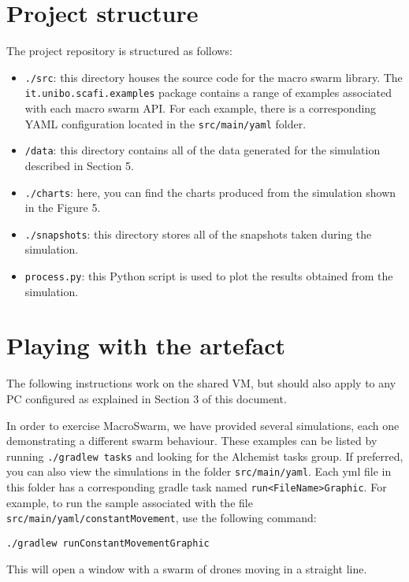\documentclass[runningheads]{llncs}
\newcommand{\MacroSwarm}{{\sc{}MacroSwarm}}
\begin{document}
\section{Project structure}

The project repository is structured as follows:
\begin{itemize}
  \item \texttt{./src}: 
  this directory houses the source code for the macro swarm library. 
  The \texttt{it.unibo.scafi.examples} package contains a range of examples associated with each macro swarm API. 
  For each example, there is a corresponding YAML configuration located in the \texttt{src/main/yaml} folder.

  \item \texttt{/data}: this directory contains all of the data generated for the simulation described in Section 5.
  
  \item \texttt{./charts}: here, you can find the charts produced from the simulation shown in the Figure 5.
  
  \item \texttt{./snapshots}: 
  this directory stores all of the snapshots taken during the simulation.
  
  \item \texttt{process.py}: 
  this Python script is used to plot the results obtained from the simulation.
  
\end{itemize}

\section{Playing with the artefact}

The following instructions work on the shared VM, 
 but should also apply to any PC configured as explained in Section 3 of this document.
 
In order to exercise \MacroSwarm{}, 
 we have provided several simulations, 
 each one demonstrating a different swarm behaviour. 
These examples can be listed by running \texttt{./gradlew tasks} and looking for the Alchemist tasks group. 
If preferred, you can also view the simulations in the folder \texttt{src/main/yaml}. 
Each yml file in this folder has a corresponding gradle task named \texttt{run<FileName>Graphic}. 
For example, to run the sample associated with the file \texttt{src/main/yaml/constantMovement}, 
use the following command: 
\begin{lstlisting}
./gradlew runConstantMovementGraphic
\end{lstlisting}
This will open a window with a swarm of drones moving in a straight line.
\end{document}
